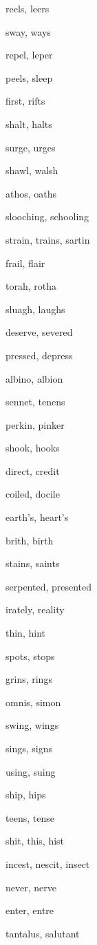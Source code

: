     \item reels, leers
    \item sway, ways
    \item repel, leper
    \item peels, sleep
    \item first, rifts
    \item shalt, halts
    \item surge, urges
    \item shawl, walsh
    \item athos, oaths
    \item slooching, schooling
    \item strain, trains, sartin
    \item frail, flair
    \item torah, rotha
    \item sluagh, laughs
    \item deserve, severed
    \item pressed, depress
    \item albino, albion
    \item sennet, tenens
    \item perkin, pinker
    \item shook, hooks
    \item direct, credit
    \item coiled, docile
    \item earth's, heart's
    \item brith, birth
    \item stains, saints
    \item serpented, presented
    \item irately, reality
    \item thin, hint
    \item spots, stops
    \item grins, rings
    \item omnis, simon
    \item swing, wings
    \item sings, signs
    \item using, suing
    \item ship, hips
    \item teens, tense
    \item shit, this, hist
    \item incest, nescit, insect
    \item never, nerve
    \item enter, entre
    \item tantalus, salutant
